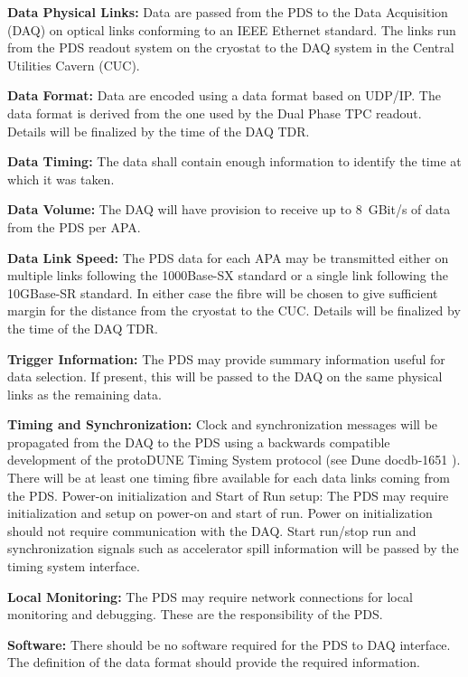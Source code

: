 
\hspace{0.5cm}\textbf{Data Physical Links: }Data are passed from the PDS to the Data Acquisition (DAQ) on optical links conforming to an IEEE Ethernet standard. The links run from the PDS readout system on the cryostat to the DAQ system in the Central Utilities Cavern (CUC).

\textbf{Data Format:} Data are encoded using a data format based on UDP/IP. The data format is derived from the one used by the Dual Phase TPC readout. Details will be finalized by the time of the DAQ TDR.

\textbf{Data Timing:} The data shall contain enough information to identify the time  at which it was taken.

\textbf{Data Volume:} The DAQ will have provision to receive up to 8~GBit/s of data from the PDS per APA.

\textbf{Data Link Speed: }The PDS data for each APA may be transmitted either on multiple links following the 1000Base-SX standard or a single link following the 10GBase-SR standard. In either case the fibre will be chosen to give sufficient margin for the distance from the cryostat to the CUC. Details will be finalized by the time of the DAQ TDR.

\textbf{Trigger Information:} The PDS may provide summary information useful for data selection. If present, this will be passed to the DAQ on the same physical links as the remaining data.

\textbf{Timing and Synchronization: }Clock and synchronization messages will be propagated from the DAQ to the PDS using a backwards compatible development of the protoDUNE Timing System protocol (see Dune docdb-1651 ). There will be at least one timing fibre available for each data links coming from the PDS. Power-on initialization and Start of Run setup:  The PDS may require initialization and setup on power-on and start of run. Power on initialization should not require communication with the DAQ. Start run/stop run and synchronization signals such as accelerator spill information will be passed by the timing system interface.

\textbf{Local Monitoring:} The PDS may require network connections for local monitoring and debugging. These are the responsibility of the PDS.

\textbf{Software:} There should be no software required for the PDS to DAQ interface. The definition of the data format should provide the required information. 

